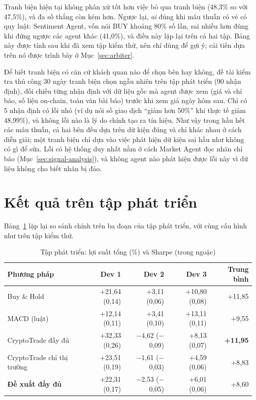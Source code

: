 Tranh biện hiện tại không phân xử tốt hơn việc bỏ qua tranh biện (48,3\% so với 47,5\%), và đa số thắng còn kém hơn.
Ngược lại, \emph{ai} đúng khi mâu thuẫn có vẻ có quy luật: Sentiment Agent, vốn nói BUY khoảng 80\% số lần, sai nhiều
hơn đúng khi đứng ngược các agent khác (41,0\%), và điều này lặp lại trên cả hai tập. Bảng này được tính sau khi đã xem
tập kiểm thử, nên chỉ dùng để gợi ý; cải tiến dựa trên nó được trình bày ở Mục~\ref{sec:arbiter}.

Để biết tranh biện có căn cứ khách quan nào để chọn bên hay không, đề tài kiểm tra thủ công 30 ngày tranh biện chọn
ngẫu nhiên trên tập phát triển (90 nhận định), đối chiếu từng nhận định với dữ liệu gốc mà agent được xem (giá và chỉ
báo, số liệu on-chain, toàn văn bài báo) trước khi xem giá ngày hôm sau. Chỉ có 5 nhận định có lỗi nhỏ (ví dụ nói số
giao dịch ``giảm hơn 50\%'' khi thực tế giảm 48,99\%), và không lỗi nào là lý do chính tạo ra tín hiệu. Như vậy trong
hầu hết các mâu thuẫn, cả hai bên đều dựa trên dữ kiện đúng và chỉ khác nhau ở cách diễn giải; một tranh biện chỉ dựa
vào việc phát hiện dữ kiện sai hầu như không có gì để sửa. Lỗi có hệ thống duy nhất nằm ở cách Market Agent đọc nhãn
chỉ báo (Mục~\ref{sec:signal-analysis}), và không agent nào phát hiện được lỗi này vì dữ liệu không cho biết nhãn bị
đảo.

\section{Kết quả trên tập phát triển}
\label{sec:dev-results}
Bảng~\ref{tab:dev-main} lặp lại so sánh chính trên ba đoạn của tập phát triển, với cùng cấu hình như trên tập kiểm thử.

\begin{table}[H]
\centering
\caption{Tập phát triển: lợi suất tổng (\%) và Sharpe (trong ngoặc)}
\label{tab:dev-main}
\small
\begin{tabular}{lrrrr}
\toprule
Phương pháp & Dev 1 & Dev 2 & Dev 3 & Trung bình \\
\midrule
Buy \& Hold & +21,64 (0,14) & +3,11 (0,06) & +10,80 (0,08) & +11,85 \\
MACD (luật) & +12,14 (0,11) & +3,41 (0,10) & +13,11 (0,11) & +9,55 \\
\midrule
CryptoTrade đầy đủ & +32,33 (0,26) & $-$4,62 ($-$0,09) & +8,13 (0,07) & \textbf{+11,95} \\
CryptoTrade chỉ thị trường & +23,51 (0,19) & $-$1,61 ($-$0,03) & +4,59 (0,06) & +8,83 \\
\midrule
\textbf{Đề xuất đầy đủ} & +22,31 (0,17) & $-$2,53 ($-$0,05) & +6,01 (0,06) & +8,60 \\
\bottomrule
\end{tabular}
\end{table}


